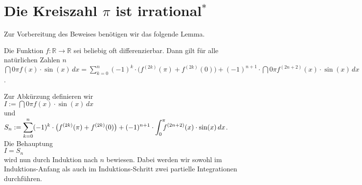 \section{Die Kreiszahl $\pi$ ist irrational$^*$}
Zur Vorbereitung des Beweises ben\"otigen wir das folgende Lemma.
\begin{Lemma}
Die Funktion $f:\mathbb{R} \rightarrow \mathbb{R}$ sei beliebig oft differenzierbar. Dann gilt 
f\"ur alle nat\"urlichen Zahlen $n$
\\[0.2cm]
\hspace*{0.8cm}
$\dint{0}{{\pi}} f(x) \cdot \sin(x)\, dx = 
  \sum\limits_{k=0}^n (-1)^k \cdot \bigl(f^{(2k)}(\pi) + f^{(2k)}(0)\bigr) + 
  (-1)^{n+1} \cdot \dint{0}{\pi} f^{(2n+2)}(x) \cdot \sin(x)\, dx
$.
\end{Lemma}

\proof
Zur Abk\"urzung definieren wir
\\[0.2cm]
\hspace*{1.3cm}
$I := \dint{0}{{\pi}} f(x) \cdot \sin(x)\, dx$ 
\\
und 
\\
\hspace*{1.3cm}
$\ds S_n := \sum\limits_{k=0}^n (-1)^k \cdot \bigl(f^{(2k)}(\pi) + f^{(2k)}(0)\bigr) + 
  (-1)^{n+1} \cdot \dint{0}{\pi} f^{(2n+2)}(x) \cdot \sin(x)\, dx
$.
\\[0.2cm]
Die Behauptung
\\[0.2cm]
\hspace*{1.3cm}
$I = S_n$
\\[0.2cm]
wird nun durch Induktion nach $n$ bewiesen.  Dabei werden  wir sowohl im Induktions-Anfang als auch
im Induktions-Schritt zwei partielle Integrationen durchf\"uhren.  
